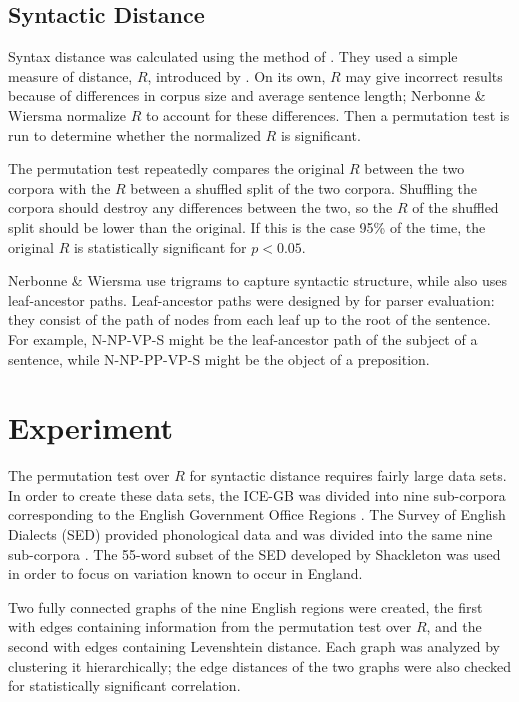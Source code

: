 \documentclass[11pt,letterpaper]{article}
\begin{document}
\subsection{Syntactic Distance}
Syntax distance was calculated using the method of
. They used a simple measure of distance,
$R$, introduced by . On its own, $R$ may give
incorrect results because of differences in corpus size and average
sentence length; Nerbonne \& Wiersma normalize $R$ to account for
these differences. Then a permutation test is run to determine whether the
normalized $R$ is significant.

The permutation test repeatedly compares the original $R$ between the
two corpora with the $R$ between a shuffled split of the two
corpora. Shuffling the corpora should destroy any differences between the
two, so the $R$ of the shuffled split should be lower than the
original. If this is the case 95\% of the time, the original $R$ is
statistically significant for $p < 0.05$.

Nerbonne \& Wiersma use trigrams to capture syntactic structure, while
 also uses leaf-ancestor
paths. Leaf-ancestor paths were designed by
 for parser evaluation: they
consist of the path of nodes from each leaf up to the root of the
sentence. For example,
N-NP-VP-S might be the leaf-ancestor path of the subject of a
sentence, while N-NP-PP-VP-S might be the object of a preposition.

\section{Experiment}

The permutation test over $R$ for syntactic distance requires fairly
large data sets. In order to create these data sets, the ICE-GB was
divided into nine sub-corpora corresponding to the English Government
Office Regions \cite{nelson02}. The Survey of English Dialects (SED)
provided phonological data and was divided into the same nine
sub-corpora \cite{orton63}. The 55-word subset of the SED developed by
Shackleton was used in order to focus on variation known to occur in
England.

Two fully connected graphs of the nine English regions were created,
the first with edges containing information
from the permutation test over $R$, and the second with edges containing
Levenshtein distance. Each graph was analyzed by clustering it
hierarchically; the edge distances of the two graphs were also
checked for statistically significant correlation.
\end{document}
